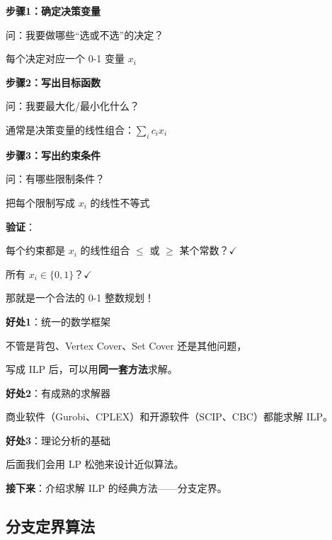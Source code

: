 \documentclass[12pt, a4paper]{ctexart}
\begin{document}
\begin{blackboard}

\textbf{步骤1：确定决策变量}

问：我要做哪些``选或不选''的决定？

每个决定对应一个 0-1 变量 $x_i$

\textbf{步骤2：写出目标函数}

问：我要最大化/最小化什么？

通常是决策变量的线性组合：$\sum_i c_i x_i$

\textbf{步骤3：写出约束条件}

问：有哪些限制条件？

把每个限制写成 $x_i$ 的线性不等式

\textbf{验证}：

每个约束都是 $x_i$ 的线性组合 $\leq$ 或 $\geq$ 某个常数？$\checkmark$

所有 $x_i \in \{0, 1\}$？$\checkmark$

那就是一个合法的 0-1 整数规划！

\end{blackboard}

\begin{blackboard}

\textbf{好处1}：统一的数学框架

不管是背包、Vertex Cover、Set Cover 还是其他问题，

写成 ILP 后，可以用\textbf{同一套方法}求解。

\textbf{好处2}：有成熟的求解器

商业软件（Gurobi、CPLEX）和开源软件（SCIP、CBC）都能求解 ILP。

\textbf{好处3}：理论分析的基础

后面我们会用 LP 松弛来设计近似算法。

\textbf{接下来}：介绍求解 ILP 的经典方法——分支定界。

\end{blackboard}

\subsection{分支定界算法}
\end{document}

